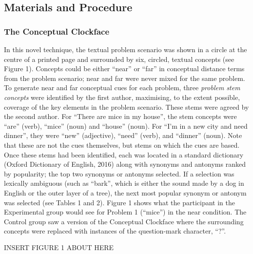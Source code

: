 \documentclass[english,man]{apa6}
\newcounter{author}
\begin{document}
\hypertarget{materials-and-procedure}{%
\subsection{Materials and Procedure}\label{materials-and-procedure}}

\hypertarget{the-conceptual-clockface}{%
\subsubsection{The Conceptual
Clockface}\label{the-conceptual-clockface}}

In this novel technique, the textual problem scenario was shown in a
circle at the centre of a printed page and surrounded by six, circled,
textual concepts (see Figure 1). Concepts could be either \enquote{near}
or \enquote{far} in conceptual distance terms from the problem scenario;
near and far were never mixed for the same problem. To generate near and
far conceptual cues for each problem, three \emph{problem stem concepts}
were identified by the first author, maximising, to the extent possible,
coverage of the key elements in the problem scenario. These stems were
agreed by the second author. For \enquote{There are mice in my house},
the stem concepts were \enquote{are} (verb), \enquote{mice} (noun) and
\enquote{house} (noun). For \enquote{I'm in a new city and need dinner},
they were \enquote{new} (adjective), \enquote{need} (verb), and
\enquote{dinner} (noun). Note that these are not the cues themselves,
but stems on which the cues are based. Once these stems had been
identified, each was located in a standard dictionary (Oxford Dictionary
of English, 2016) along with synonyms and antonyms ranked by popularity;
the top two synonyms or antonyms selected. If a selection was lexically
ambiguous (such as \enquote{bark}, which is either the sound made by a
dog in English or the outer layer of a tree), the next most popular
synonym or antonym was selected (see Tables 1 and 2). Figure 1 shows
what the participant in the Experimental group would see for Problem 1
(\enquote{mice}) in the near condition. The Control group saw a version
of the Conceptual Clockface where the surrounding concepts were replaced
with instances of the question-mark character, \enquote{?}.

INSERT FIGURE 1 ABOUT HERE
\end{document}
